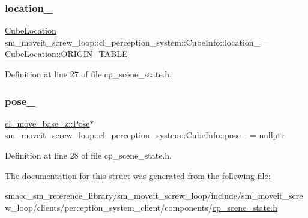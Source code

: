 \subsubsection{\texorpdfstring{location\+\_\+}{location\_}}
{\footnotesize\ttfamily \hyperlink{namespacesm__moveit__screw__loop_1_1cl__perception__system_a3685ee11048648ccb59214d2341fb8ca}{Cube\+Location} sm\+\_\+moveit\+\_\+screw\+\_\+loop\+::cl\+\_\+perception\+\_\+system\+::\+Cube\+Info\+::location\+\_\+ = \hyperlink{namespacesm__moveit__screw__loop_1_1cl__perception__system_a3685ee11048648ccb59214d2341fb8caae5ee34c3ef8ec4a46a00a218416c7b1d}{Cube\+Location\+::\+O\+R\+I\+G\+I\+N\+\_\+\+T\+A\+B\+LE}}



Definition at line 27 of file cp\+\_\+scene\+\_\+state.\+h.

\mbox{\label{structsm__moveit__screw__loop_1_1cl__perception__system_1_1CubeInfo_adcc560e6598dd84a223fa93bb442149a}} 
\subsubsection{\texorpdfstring{pose\+\_\+}{pose\_}}
{\footnotesize\ttfamily \hyperlink{classcl__move__base__z_1_1Pose}{cl\+\_\+move\+\_\+base\+\_\+z\+::\+Pose}$\ast$ sm\+\_\+moveit\+\_\+screw\+\_\+loop\+::cl\+\_\+perception\+\_\+system\+::\+Cube\+Info\+::pose\+\_\+ = nullptr}



Definition at line 28 of file cp\+\_\+scene\+\_\+state.\+h.



The documentation for this struct was generated from the following file\+:\begin{DoxyCompactItemize}
\item 
smacc\+\_\+sm\+\_\+reference\+\_\+library/sm\+\_\+moveit\+\_\+screw\+\_\+loop/include/sm\+\_\+moveit\+\_\+screw\+\_\+loop/clients/perception\+\_\+system\+\_\+client/components/\hyperlink{sm__moveit__screw__loop_2include_2sm__moveit__screw__loop_2clients_2perception__system__client_2components_2cp__scene__state_8h}{cp\+\_\+scene\+\_\+state.\+h}\end{DoxyCompactItemize}
